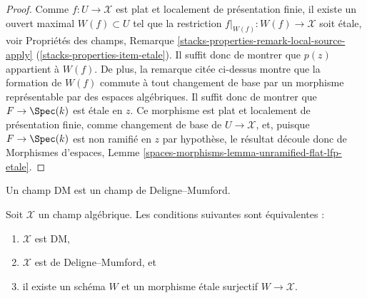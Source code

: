 \begin{proof}
Comme $f : U \to \mathcal{X}$ est plat et localement de présentation finie,
il existe un ouvert maximal $W(f) \subset U$ tel que la restriction
$f|_{W(f)} : W(f) \to \mathcal{X}$ soit étale, voir Propriétés des champs,
Remarque
\ref{stacks-properties-remark-local-source-apply}
(\ref{stacks-properties-item-etale}).
Il suffit donc de montrer que $p(z)$ appartient à $W(f)$.
De plus, la remarque citée ci-dessus montre que la formation de $W(f)$ commute
à tout changement de base par un morphisme représentable par des espaces
algébriques. Il suffit donc de montrer que $F \to \Spec(k)$ est étale en $z$.
Ce morphisme est plat et localement de présentation finie, comme changement
de base de $U \to \mathcal{X}$, et, puisque $F \to \Spec(k)$ est non ramifié
en $z$ par hypothèse,
le résultat découle donc de Morphismes d'espaces,
Lemme \ref{spaces-morphisms-lemma-unramified-flat-lfp-etale}.
\end{proof}

\noindent
Un champ DM est un champ de Deligne--Mumford.

\begin{theorem}
\label{theorem-DM}
Soit $\mathcal{X}$ un champ algébrique. Les conditions suivantes sont
équivalentes :
\begin{enumerate}
\item $\mathcal{X}$ est DM,
\item $\mathcal{X}$ est de Deligne--Mumford, et
\item il existe un schéma $W$ et un morphisme étale surjectif
$W \to \mathcal{X}$.
\end{enumerate}
\end{theorem}

